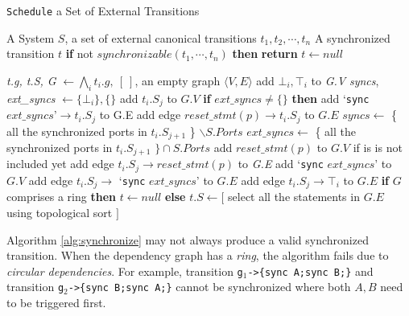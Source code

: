 \begin{algorithm}[t]
    \caption{\texttt{Schedule} a Set of External Transitions}
    \label{alg:synchronize}
    \small
    \begin{algorithmic}[1]
        \REQUIRE A System $S$, a set of external canonical transitions $t_1,t_2,\cdots,t_n$
        \ENSURE A synchronized transition $t$
        \STATE \textbf{if} not $synchronizable(t_1,\cdots,t_n)$ \textbf{then} \textbf{return} $t\leftarrow null$

        \STATE \emph{t.g, t.S, G} $\leftarrow \bigwedge_i t_i.g,\:[\:]$, an empty graph $\langle V,E\rangle$
            \STATE add $\bot_i, \top_i$ to \emph{G.V}
            \STATE \emph{syncs}, \emph{ext\_syncs} $\leftarrow\{\bot_i\},\{\}$
                \STATE add $t_i.S_{j}$ to $G.V$
                \STATE \textbf{if} $ext\_syncs\neq\{\}$ \textbf{then} add `\texttt{sync} $ext\_syncs\mbox{'}\rightarrow t_i.S_j$ to G.E 
                    \STATE add edge $reset\_stmt(p)\rightarrow t_i.S_j$ to $G.E$
                \ENDFOR
                \STATE $syncs\leftarrow$ \{ all the synchronized ports in $t_i.S_{j+1}$ \} $\backslash S.Ports$ \STATE $ext\_syncs\leftarrow$ \{ all the synchronized ports in $t_i.S_{j+1}$ $\}\cap S.Ports$
                        \STATE add $reset\_stmt(p)$ to $G.V$ if is is not included yet
                        \STATE add edge $t_i.S_j \rightarrow reset\_stmt(p)$ to \emph{G.E}
                    \ENDFOR
                        \STATE add `\texttt{sync} $ext\_syncs$' to $G.V$
                        \STATE add edge $t_i.S_j\rightarrow$ `\texttt{sync} $ext\_syncs$' to $G.E$
                    \ENDIF
                \ELSE
                    \STATE add edge $t_i.S_j\rightarrow \top_i$ to $G.E$
                \ENDIF
            \ENDFOR
        \ENDFOR
        \STATE \textbf{if} $G$ comprises a ring \textbf{then} $t\leftarrow null$
        \STATE \textbf{else} $t.S\leftarrow[$ select all the statements in $G.E$ using topological sort $]$
    \end{algorithmic}
\end{algorithm}

Algorithm \ref{alg:synchronize} may not always produce a valid synchronized transition. When the dependency graph has a \emph{ring}, the algorithm fails due to \emph{circular dependencies}.
For example, transition \texttt{g$_1$->\{sync A;sync B;\}} and transition \texttt{g$_2$->\{sync B;sync A;\}} cannot be synchronized where both $A,B$ need to be triggered first.


